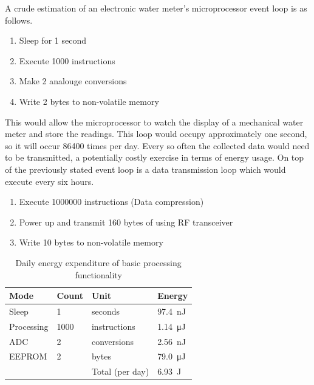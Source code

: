     A crude estimation of an electronic water meter's microprocessor event loop is as follows.
    \begin{enumerate}
      \item Sleep for 1 second
      \item Execute 1000 instructions
      \item Make 2 analouge conversions
      \item Write 2 bytes to non-volatile memory
    \end{enumerate}
    This would allow the microprocessor to watch the display of a mechanical water meter and store the readings.
    This loop would occupy approximately one second, so it will occur 86400 times per day.
    Every so often the collected data would need to be transmitted, a potentially costly exercise in terms of energy usage.
    On top of the previously stated event loop is a data transmission loop which would execute every six hours.
    \begin{enumerate}
      \item Execute 1000000 instructions (Data compression)
      \item Power up and transmit 160 bytes of using RF transceiver
      \item Write 10 bytes to non-volatile memory
    \end{enumerate}

    \begin{table}
      \centering
      \begin{tabular}{|l|l|l|l|}
        \hline
        Mode & Count & Unit & Energy \\ \hline
        Sleep & 1 & seconds & \SI{97.4}{\nano\joule} \\
        Processing & 1000 & instructions & \SI{1.14}{\micro\joule} \\
        ADC & 2 & conversions & \SI{2.56}{\nano\joule} \\
        EEPROM & 2 & bytes & \SI{79.0}{\micro\joule} \\ \hline \hline
        &&Total (per day) & \SI{6.93}{\joule} \\ \hline
      \end{tabular}
      \caption{\label{tab:EnergyBudget-EventLoop}Daily energy expenditure of basic processing functionality}
    \end{table}


